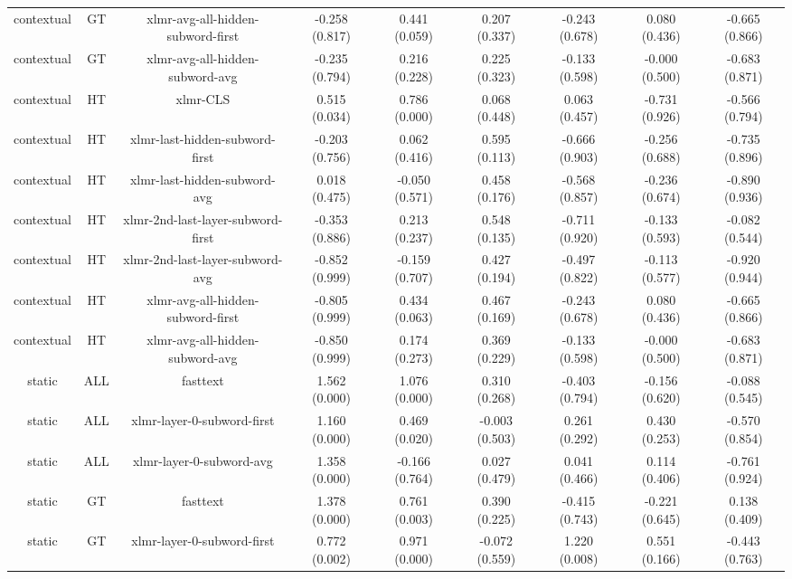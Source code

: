 \begin{sidewaystable}[htb]
\begin{tabular}{@{}ccccccccc@{}}
        contextual & GT & xlmr-avg-all-hidden-subword-first & -0.258 (0.817) & 0.441 (0.059) & 0.207 (0.337) & -0.243 (0.678) & 0.080 (0.436) & -0.665 (0.866) \\
        contextual & GT & xlmr-avg-all-hidden-subword-avg & -0.235 (0.794) & 0.216 (0.228) & 0.225 (0.323) & -0.133 (0.598) & -0.000 (0.500) & -0.683 (0.871) \\
        contextual & HT & xlmr-CLS & 0.515 (0.034) & 0.786 (0.000) & 0.068 (0.448) & 0.063 (0.457) & -0.731 (0.926) & -0.566 (0.794) \\
        contextual & HT & xlmr-last-hidden-subword-first & -0.203 (0.756) & 0.062 (0.416) & 0.595 (0.113) & -0.666 (0.903) & -0.256 (0.688) & -0.735 (0.896) \\
        contextual & HT & xlmr-last-hidden-subword-avg & 0.018 (0.475) & -0.050 (0.571) & 0.458 (0.176) & -0.568 (0.857) & -0.236 (0.674) & -0.890 (0.936) \\
        contextual & HT & xlmr-2nd-last-layer-subword-first & -0.353 (0.886) & 0.213 (0.237) & 0.548 (0.135) & -0.711 (0.920) & -0.133 (0.593) & -0.082 (0.544) \\
        contextual & HT & xlmr-2nd-last-layer-subword-avg & -0.852 (0.999) & -0.159 (0.707) & 0.427 (0.194) & -0.497 (0.822) & -0.113 (0.577) & -0.920 (0.944) \\
        contextual & HT & xlmr-avg-all-hidden-subword-first & -0.805 (0.999) & 0.434 (0.063) & 0.467 (0.169) & -0.243 (0.678) & 0.080 (0.436) & -0.665 (0.866) \\
        contextual & HT & xlmr-avg-all-hidden-subword-avg & -0.850 (0.999) & 0.174 (0.273) & 0.369 (0.229) & -0.133 (0.598) & -0.000 (0.500) & -0.683 (0.871) \\
        static & ALL & fasttext & 1.562 (0.000) & 1.076 (0.000) & 0.310 (0.268) & -0.403 (0.794) & -0.156 (0.620) & -0.088 (0.545) \\
        static & ALL & xlmr-layer-0-subword-first & 1.160 (0.000) & 0.469 (0.020) & -0.003 (0.503) & 0.261 (0.292) & 0.430 (0.253) & -0.570 (0.854) \\
        static & ALL & xlmr-layer-0-subword-avg & 1.358 (0.000) & -0.166 (0.764) & 0.027 (0.479) & 0.041 (0.466) & 0.114 (0.406) & -0.761 (0.924) \\
        static & GT & fasttext & 1.378 (0.000) & 0.761 (0.003) & 0.390 (0.225) & -0.415 (0.743) & -0.221 (0.645) & 0.138 (0.409) \\
        static & GT & xlmr-layer-0-subword-first & 0.772 (0.002) & 0.971 (0.000) & -0.072 (0.559) & 1.220 (0.008) & 0.551 (0.166) & -0.443 (0.763) \\

\end{tabular}
\end{sidewaystable}
